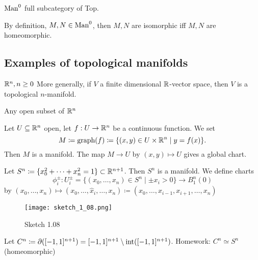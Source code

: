 \begin{remark}
    \(\man0\) full subcategory of Top.
\end{remark}

\begin{remark}
    By definition, \(M,N\in\man0\), then \(M,N\) are isomorphic iff \(M,N\) are homeomorphic.
\end{remark}

\subsection{Examples of topological manifolds}

\begin{example}
    \(\mathbb{R}^n,n\geq 0\) More generally, if \(V\) a finite dimensional \(\mathbb{R}\)-vector space, then \(V\)
    is a topological \(n\)-manifold.
\end{example}

\begin{example}
    Any open subset of \(\mathbb{R}^n\)
\end{example}

\begin{example}[Graphs]
    Let \(U\subseteq \mathbb{R}^n\) open, let \(f:U\to\mathbb{R}^n\) be a continuous function. We set 
    \[M\coloneqq\text{graph}(f)\coloneqq \{(x,y)\in U\times \mathbb{R}^n\mid y=f(x)\}.\]
    Then \(M\) is a manifold. The map \(M\to U\) by \((x,y)\mapsto U\) gives a global chart.
\end{example}

\begin{example}[Spheres]
    Let \(S^n\coloneqq \{x_0^2+\dots+x_n^2=1\}\subset \mathbb{R}^{n+1}\). Then \(S^n\) is a manifold.
    We define charts \[\phi_i^{\pm}:U_i^\pm = \{(x_0,\dots,x_n)\in S^n\mid \pm x_i>0\}\to B_1^n(0)\]
    by \((x_0,\dots,x_n)\mapsto (x_0,\dots,\hat{x}_i,\dots,x_n)\coloneqq (x_0,\dots,x_{i-1},x_{i+1},\dots,x_n)\)
    \begin{figure}[H]
        \centering
        \texttt{[image: sketch\_1\_08.png]}
        \caption{Sketch 1.08}
    \end{figure}
\end{example}

\begin{example}[spheres']
    Let \(C^n\coloneqq \partial([-1,1]^{n+1})=[-1,1]^{n+1}\setminus\text{int}([-1,1]^{n+1})\).
    Homework: \(C^n\simeq S^n\) (homeomorphic)
\end{example}

